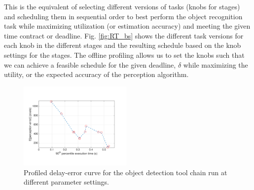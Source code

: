 
This is the equivalent of selecting different versions of tasks (knobs for stages) and scheduling them in sequential order to best perform the object recognition task while maximizing utilization (or estimation accuracy) and meeting the given time contract or deadline. Fig. \ref{fig:RT_bs} shows the different task versions for each knob in the different stages and the resulting schedule based on the knob settings for the stages. The offline profiling allows us to set the knobs such that we can achieve a feasible schedule for the given deadline, $\delta$ while maximizing the utility, or the expected accuracy of the perception algorithm. 

\begin{figure}[t]
	\centering
	\includegraphics[trim = 0 30mm 0 30mm, width=0.49\textwidth]{figures/chainErrorDelay}
	\caption{Profiled delay-error curve for the object detection tool chain run at different parameter settings.}
	\label{fig:eps_delta_toy}
	\vspace{-10pt}
\end{figure}



